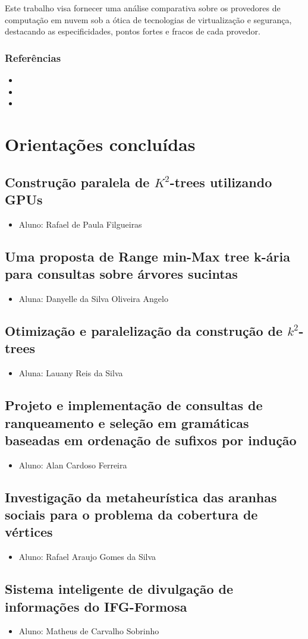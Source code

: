 \documentclass{article}
\newcommand*{\nsubsection}[1]{
    \subsection*{#1}
}
\begin{document}
Este trabalho visa fornecer uma análise comparativa sobre os provedores de computação em nuvem sob a ótica de tecnologias de virtualização e segurança, destacando as especificidades, pontos fortes e fracos de cada provedor.




\subsubsection*{Referências}
\begin{itemize}
	\item {}	
	\item {}
	\item {}
\end{itemize}

\newpage
\section{Orientações concluídas}

\nsubsection{Construção paralela de $K^2$-trees utilizando GPUs}

\begin{itemize}
	\item Aluno: Rafael de Paula Filgueiras
\end{itemize}


\nsubsection{Uma proposta de Range min-Max tree k-ária para consultas sobre
árvores sucintas}

\begin{itemize}
	\item Aluna: Danyelle da Silva Oliveira Angelo
\end{itemize}

\nsubsection{Otimização e paralelização da construção de $k^2$-trees}

\begin{itemize}
	\item Aluna: Lauany Reis da Silva
\end{itemize}

\nsubsection{Projeto e implementação de consultas de ranqueamento e seleção em gramáticas baseadas em ordenação de sufixos por indução}

\begin{itemize}
	\item Aluno: Alan Cardoso Ferreira
\end{itemize}

\nsubsection{Investigação da metaheurística das aranhas sociais para o problema da cobertura de vértices}

\begin{itemize}
	\item Aluno: Rafael Araujo Gomes da Silva
\end{itemize}

\nsubsection{Sistema inteligente de divulgação de informações do IFG-Formosa}

\begin{itemize}
	\item Aluno: Matheus de Carvalho Sobrinho
\end{itemize}
\end{document}
